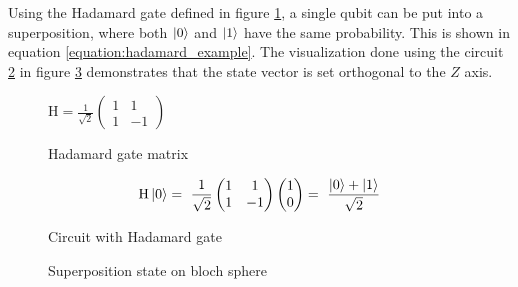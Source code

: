 Using the Hadamard\cite{qiskit_hgate_nodate} gate defined in figure \ref{fig:matrix_hadamard}, a single qubit can be put into a superposition, where both $\ket{0}$ and $\ket{1}$ have the same probability. This is shown in equation \ref{equation:hadamard_example}. The visualization done using the circuit \ref{fig:circuit_hadamard} in figure \ref{fig:circuit_hadamard_bloch_sphere} demonstrates that the state vector is set orthogonal to the $Z$ axis.

\begin{figure}[!h]
    \centering
    $\mathrm{H} = \frac{1}{\sqrt{2}}\begin{pmatrix}1 & 1 \\1 & -1\end{pmatrix}$
    \caption{Hadamard gate matrix}
    \label{fig:matrix_hadamard}
\end{figure}

\begin{equation}
    \centering
    \begin{split}
        \mathrm{H}\ket{0} =\ \frac{1}{\sqrt{2}}\begin{pmatrix}1 & 1 \\1 & -1\end{pmatrix}\begin{pmatrix}1 \\ 0\end{pmatrix} =\ \frac{\ket{0} + \ket{1}}{\sqrt{2}}
    \end{split}
    \label{equation:hadamard_example}
\end{equation}


\begin{figure}[!h]
    \centering
    \caption{Circuit with Hadamard gate}
    \label{fig:circuit_hadamard}
\end{figure}

\begin{figure}[!h]
    \centering
    \caption{Superposition state on bloch sphere}
    \label{fig:circuit_hadamard_bloch_sphere}
\end{figure}


